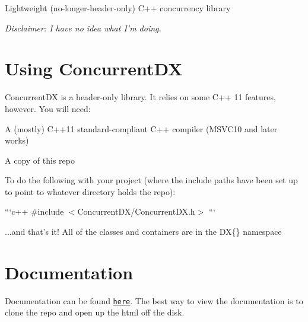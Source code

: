 Lightweight (no-\/longer-\/header-\/only) C++ concurrency library

{\itshape Disclaimer\-: I have no idea what I'm doing.}

\section*{Using Concurrent\-D\-X}

Concurrent\-D\-X is a header-\/only library. It relies on some C++ 11 features, however. You will need\-:


\begin{DoxyItemize}
\item A (mostly) C++11 standard-\/compliant C++ compiler (M\-S\-V\-C10 and later works)
\item A copy of this repo
\item To do the following with your project (where the include paths have been set up to point to whatever directory holds the repo)\-:
\end{DoxyItemize}

```c++ \#include $<$Concurrent\-D\-X/\-Concurrent\-D\-X.\-h$>$ ```
\begin{DoxyItemize}
\item ...and that's it! All of the classes and containers are in the D\-X\{\} namespace
\end{DoxyItemize}

\section*{Documentation}

Documentation can be found \href{/html/index.html}{\tt here}. The best way to view the documentation is to clone the repo and open up the html off the disk. 
